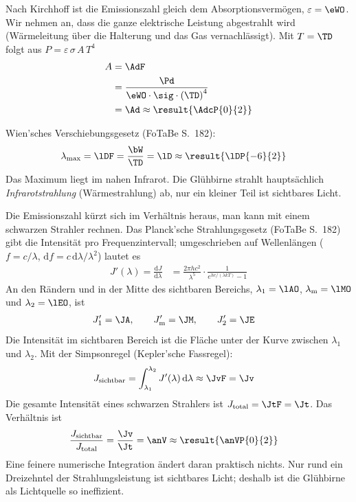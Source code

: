 \begin{abcliste}
\abc Nach Kirchhoff ist die Emissionszahl gleich dem Absorptionsvermögen, $\varepsilon = \eWO$. Wir nehmen an, dass die ganze elektrische Leistung abgestrahlt wird (Wärmeleitung über die Halterung und das Gas vernachlässigt). Mit $T = \TD$ folgt aus $P = \varepsilon\,\sigma\,A\,T^4$
\begin{align}
 A &= \AdF \\
   &= \frac{\Pd}{\eWO\cdot\sig\cdot\left(\TD\right)^4} \\
   &= \Ad \approx \result{\AdcP{0}{2}}
\end{align}

\abc Wien'sches Verschiebungsgesetz (FoTaBe S.~182):
\begin{align}
 \lambda_\text{max} &= \lDF = \frac{\bW}{\TD} = \lD \approx \result{\lDP{-6}{2}}
\end{align}
Das Maximum liegt im nahen Infrarot. Die Glühbirne strahlt hauptsächlich \emph{Infrarotstrahlung} (Wärmestrahlung) ab, nur ein kleiner Teil ist sichtbares Licht.

\abc Die Emissionszahl kürzt sich im Verhältnis heraus, man kann mit einem schwarzen Strahler rechnen. Das Planck'sche Strahlungsgesetz (FoTaBe S.~182) gibt die Intensität pro Frequenzintervall; umgeschrieben auf Wellenlängen ($f = c/\lambda$, $\mathrm{d}f = c\,\mathrm{d}\lambda/\lambda^2$) lautet es
\begin{align}
 J'(\lambda) = \frac{\mathrm{d}J}{\mathrm{d}\lambda} &= \frac{2\pi h c^2}{\lambda^5}\cdot\frac{1}{e^{hc/(\lambda kT)}-1}
\end{align}
An den Rändern und in der Mitte des sichtbaren Bereichs, $\lambda_1 = \lAO$, $\lambda_\text{m} = \lMO$ und $\lambda_2 = \lEO$, ist
\begin{align}
 J'_1 &= \JA, \qquad J'_\text{m} = \JM, \qquad J'_2 = \JE
\end{align}
Die Intensität im sichtbaren Bereich ist die Fläche unter der Kurve zwischen $\lambda_1$ und $\lambda_2$. Mit der Simpsonregel (Kepler'sche Fassregel):
\begin{align}
 J_\text{sichtbar} &= \int_{\lambda_1}^{\lambda_2} J'(\lambda)\,\mathrm{d}\lambda \approx \JvF = \Jv
\end{align}
Die gesamte Intensität eines schwarzen Strahlers ist $J_\text{total} = \JtF = \Jt$. Das Verhältnis ist
\begin{align}
 \frac{J_\text{sichtbar}}{J_\text{total}} &= \frac{\Jv}{\Jt} = \anV \approx \result{\anVP{0}{2}}
\end{align}
Eine feinere numerische Integration ändert daran praktisch nichts. Nur rund ein Dreizehntel der Strahlungsleistung ist sichtbares Licht; deshalb ist die Glühbirne als Lichtquelle so ineffizient.
\end{abcliste}
